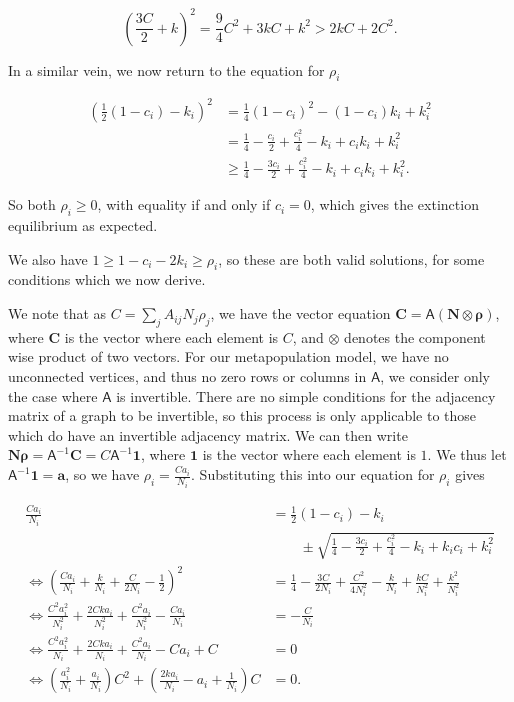\documentclass[12pt,a4paper,openany,twoside]{book}
\renewcommand{\v}[1]{\mathbf{#1}}      %
\newcommand{\m}[1]{\bm{\mathsf{#1}}}	 %
\begin{document}
\begin{equation}
	\left( \frac {3 C} {2} + k \right)^2 = \frac 9 4 C^2 + 3 k C + k^2 > 2 k C + 2 C^2.
\end{equation}

In a similar vein, we now return to the equation for $\rho_i$

\begin{equation}
\begin{aligned}
	\left( \frac 1 2 (1 - c_i) - k_i \right)^2 &= \frac 1 4 (1 - c_i)^2 - (1- c_i) k_i + k_i^2 \\
	&= \frac 1 4 - \frac {c_i} 2 + \frac {c_i^2} 4 - k_i + c_i k_i + k_i^2 \\
	&\geq \frac 1 4 - \frac {3 c_i} 2 + \frac {c_i^2} 4 - k_i + c_i k_i + k_i^2.
\end{aligned}
\end{equation}

So both $\rho_i \geq 0$, with equality if and only if $c_i = 0$, which gives the extinction equilibrium as expected.

We also have $1 \geq 1 - c_i - 2 k_i \geq \rho_i$, so these are both valid solutions, for some conditions which we now derive.

We note that as $C = \sum_j A_{ij} N_j \rho_j$, we have the vector equation $\v C = \m A (\v N \otimes \boldsymbol{\rho})$, where $\v C$ is the vector where each element is $C$, and $\otimes$ denotes the component wise product of two vectors. For our metapopulation model, we have no unconnected vertices, and thus no zero rows or columns in $\m A$, we consider only the case where $\m A$ is invertible. There are no simple conditions for the adjacency matrix of a graph to be invertible, so this process is only applicable to those which do have an invertible adjacency matrix. We can then write $\v N \boldsymbol{\rho} = \m A^{-1} \v C = C \m A^{-1} \v 1$, where $\v 1$ is the vector where each element is $1$. We thus let $\m A^{-1} \v 1 = \v a$, so we have $\rho_i = \frac {C a_i} {N_i}$. Substituting this into our equation for $\rho_i$ gives

\begin{equation}
\begin{aligned}
	\frac {C a_i} {N_i} &= \frac 1 2 (1 - c_i) - k_i \\
	&\qquad \pm \sqrt{\frac 1 4 - \frac {3 c_i} 2 + \frac {c_i^2} {4} - k_i + k_i c_i + k_i^2} \\
	\iff \left( \frac {C a_i} {N_i} + \frac k {N_i} + \frac C {2 N_i} - \frac 1 2 \right)^2 &= \frac 1 4 - \frac {3C} {2N_i} + \frac {C^2} {4 N_i^2} - \frac k {N_i} + \frac {k C} {N_i^2} + \frac {k^2} {N_i^2} \\
	\iff \frac {C^2 a_i^2} {N_i^2} + \frac {2 C k a_i} {N_i^2} + \frac {C^2 a_i} {N_i^2} - \frac {C a_i} {N_i} &= - \frac C {N_i} \\
	\iff \frac {C^2 a_i^2} {N_i} + \frac {2 C k a_i} {N_i} + \frac {C^2 a_i} {N_i} - C a_i + C &= 0 \\
	\iff \left( \frac {a_i^2} {N_i} + \frac {a_i} {N_i} \right) C^2 + \left( \frac {2 k a_i} {N_i} - a_i + \frac 1 {N_i} \right) C &= 0.
\end{aligned}
\end{equation}
\end{document}

